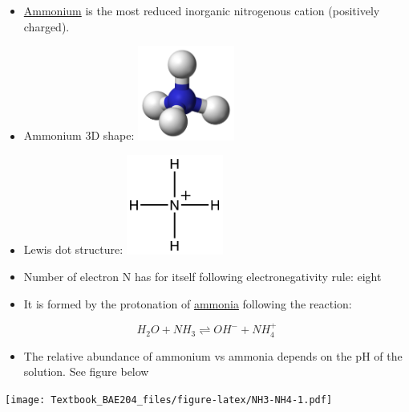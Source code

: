 \documentclass[]{book}
\providecommand{\tightlist}{%
  \setlength{\itemsep}{0pt}\setlength{\parskip}{0pt}}
\theoremstyle{definition}
\theoremstyle{definition}
\theoremstyle{definition}
\theoremstyle{remark}
\begin{document}
\begin{itemize}
\tightlist
\item
  \href{https://en.wikipedia.org/wiki/Ammonium}{Ammonium} is the most
  reduced inorganic nitrogenous cation (positively charged).
\item
  Ammonium 3D shape:
  \includegraphics[width=0.25000\textwidth]{pictures/Ammonium-3D-balls.png}
\item
  Lewis dot structure:
  \includegraphics[width=0.25000\textwidth]{pictures/ammonium_lewis_structure.png}
\item
  Number of electron N has for itself following electronegativity rule:
  eight
\item
  It is formed by the protonation of \protect\hyperlink{NH3}{ammonia}
  following the reaction:
\end{itemize}

\begin{equation}
H_2O + NH_3 \rightleftharpoons OH^{-} + NH_4^{+} \label{eq:NH3}
\end{equation}

\begin{itemize}
\tightlist
\item
  The relative abundance of ammonium vs ammonia depends on the pH of the
  solution. See figure below
\end{itemize}

\texttt{[image: Textbook\_BAE204\_files/figure-latex/NH3-NH4-1.pdf]}
\end{document}
